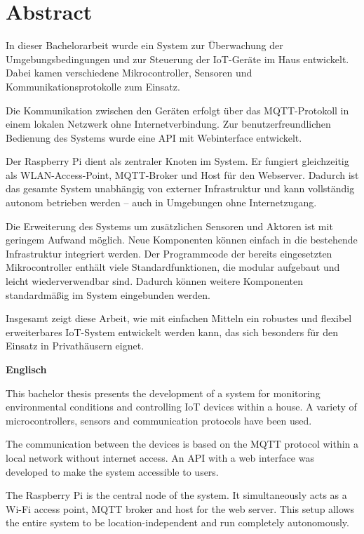 \documentclass[12pt, letterpaper]{article}
\author{Oleksii Baida}
\date{Mai 2024}
\begin{document}


\tableofcontents
\pagebreak
\section*{Abstract}
\par In dieser Bachelorarbeit wurde ein System zur Überwachung der Umgebungsbedingungen und zur Steuerung der IoT-Geräte im Haus entwickelt. Dabei kamen verschiedene Mikrocontroller, Sensoren und Kommunikationsprotokolle zum Einsatz. 
\par Die Kommunikation zwischen den Geräten erfolgt über das MQTT-Protokoll in einem lokalen Netzwerk ohne Internetverbindung. Zur benutzerfreundlichen Bedienung des Systems wurde eine API mit Webinterface entwickelt. 
\par Der Raspberry Pi dient als zentraler Knoten im System. Er fungiert gleichzeitig als WLAN-Access-Point, MQTT-Broker und Host für den Webserver. Dadurch ist das gesamte System unabhängig von externer Infrastruktur und kann vollständig autonom betrieben werden – auch in Umgebungen ohne Internetzugang.
\par Die Erweiterung des Systems um zusätzlichen Sensoren und Aktoren ist mit geringem Aufwand möglich. Neue Komponenten können einfach in die bestehende Infrastruktur integriert werden. Der Programmcode der bereits eingesetzten Mikrocontroller enthält viele Standardfunktionen, die modular aufgebaut und leicht wiederverwendbar sind. Dadurch können weitere Komponenten standardmäßig im System eingebunden werden.
\par Insgesamt zeigt diese Arbeit, wie mit einfachen Mitteln ein robustes und flexibel erweiterbares IoT-System entwickelt werden kann, das sich besonders für den Einsatz in Privathäusern eignet.
\par \textbf{}
\par \textbf{}
\par \textbf{Englisch}
\par This bachelor thesis presents the development of a system for monitoring environmental conditions and controlling IoT devices within a house. A variety of microcontrollers, sensors and communication protocols have been used. 
\par The communication between the devices is based on the MQTT protocol within a local network without internet access. An API with a web interface was developed to make the system accessible to users.
\par The Raspberry Pi is the central node of the system. It simultaneously acts as a Wi-Fi access point, MQTT broker and host for the web server. This setup allows the entire system to be location-independent and run completely autonomously. 
\end{document}
